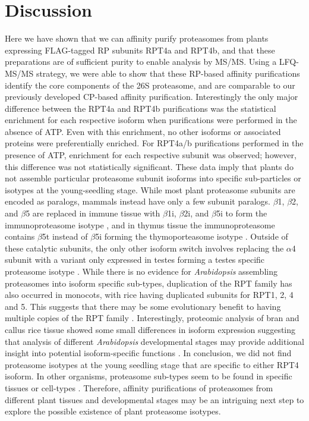 \section{Discussion}
 	Here we have shown that we can affinity purify proteasomes from plants expressing FLAG-tagged RP subunits RPT4a and RPT4b, and that these preparations are of sufficient purity to enable analysis by MS/MS.  Using a LFQ-MS/MS strategy, we were able to show that these RP-based affinity purifications identify the core components of the 26S proteasome, and are comparable to our previously developed CP-based affinity purification. Interestingly the only major difference between the RPT4a and RPT4b purifications was the statistical enrichment for each respective isoform when purifications were performed in the absence of ATP. Even with this enrichment, no other isoforms or associated proteins were preferentially enriched. For RPT4a/b purifications performed in the presence of ATP, enrichment for each respective subunit was observed; however, this difference was not statistically significant. These data imply that plants do not assemble particular proteasome subunit isoforms into specific sub-particles or isotypes at the young-seedling stage. While most plant proteasome subunits are encoded as paralogs, mammals instead have only a few subunit paralogs. $\beta$1, $\beta$2, and $\beta$5 are replaced in immune tissue with $\beta$1i, $\beta$2i, and $\beta$5i to form the immunoproteasome isotype \citep{nandi96}, and in thymus tissue the immunoproteasome contains $\beta$5t instead of $\beta$5i forming the thymoporteasome isotype \citep{murata07}. Outside of these catalytic subunits, the only other isoform switch involves replacing the $\alpha$4 subunit with a variant only expressed in testes forming a testes specific proteasome isotype \citep{belote98, uechi14}.   While there is no evidence for \textit{Arabidopsis} assembling proteasomes into isoform specific sub-types, duplication of the RPT family has also occurred in monocots, with rice having duplicated subunits for RPT1, 2, 4 and 5. This suggests that there may be some evolutionary benefit to having multiple copies of the RPT family \citep{shibahara04}. Interestingly, proteomic analysis of bran and callus rice tissue showed some small differences in isoform expression suggesting that analysis of different \textit{Arabidopsis} developmental stages may provide additional insight into potential isoform-specific functions \citep{shibahara04}. In conclusion, we did not find proteasome isotypes at the young seedling stage that are specific to either RPT4 isoform. In other organisms, proteasome sub-types seem to be found in specific tissues or cell-types \citep{belote98, murata07, nandi96, uechi14}. Therefore, affinity purifications of proteasomes from different plant tissues and developmental stages may be an intriguing next step to explore the possible existence of plant proteasome isotypes.
 	
